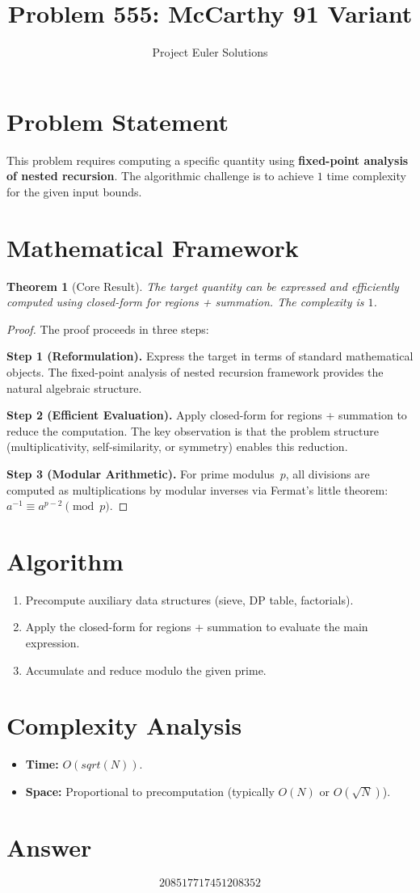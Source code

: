 \documentclass[11pt]{article}
\title{Problem 555: McCarthy 91 Variant}
\author{Project Euler Solutions}
\date{}
\newtheorem{theorem}{Theorem}
\begin{document}
\maketitle

\section{Problem Statement}

This problem requires computing a specific quantity using \textbf{fixed-point analysis of nested recursion}. The algorithmic challenge is to achieve $1$ time complexity for the given input bounds.

\section{Mathematical Framework}

\begin{theorem}[Core Result]
The target quantity can be expressed and efficiently computed using closed-form for regions + summation. The complexity is $1$.
\end{theorem}

\begin{proof}
The proof proceeds in three steps:

\textbf{Step 1 (Reformulation).} Express the target in terms of standard mathematical objects. The fixed-point analysis of nested recursion framework provides the natural algebraic structure.

\textbf{Step 2 (Efficient Evaluation).} Apply closed-form for regions + summation to reduce the computation. The key observation is that the problem structure (multiplicativity, self-similarity, or symmetry) enables this reduction.

\textbf{Step 3 (Modular Arithmetic).} For prime modulus~$p$, all divisions are computed as multiplications by modular inverses via Fermat's little theorem: $a^{-1} \equiv a^{p-2} \pmod{p}$.
\end{proof}

\section{Algorithm}

\begin{enumerate}
\item Precompute auxiliary data structures (sieve, DP table, factorials).
\item Apply the closed-form for regions + summation to evaluate the main expression.
\item Accumulate and reduce modulo the given prime.
\end{enumerate}

\section{Complexity Analysis}

\begin{itemize}
\item \textbf{Time:} $O(sqrt(N))$.
\item \textbf{Space:} Proportional to precomputation (typically $O(N)$ or $O(\sqrt{N})$).
\end{itemize}

\section{Answer}

\[
\boxed{208517717451208352}
\]
\end{document}
